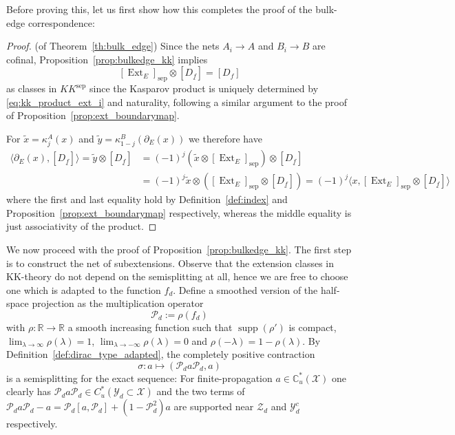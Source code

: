 \documentclass[12pt]{amsart}
\newcommand{\CM}{{\mathbb C}}
\newcommand{\RM}{{\mathbb R}}
\newcommand{\Pp}{{\mathcal P}}
\newcommand{\Xx}{{\mathcal X}}
\newcommand{\Yy}{{\mathcal Y}}
\newcommand{\Zz}{{\mathcal Z}}
\newcommand{\pdv}{\partial}
\DeclareMathOperator*{\Ext}{Ext}
\DeclareMathOperator{\supp}{supp}
\begin{document}
Before proving this, let us first show how this completes the proof of the bulk-edge correspondence:
\begin{proof} (of Theorem~\ref{th:bulk_edge}) 
Since the nets $A_i\to A$ and $B_i\to B$ are cofinal, Proposition~\ref{prop:bulkedge_kk} implies
$$[{\Ext}_E]_{\mathrm{sep}} \otimes [D_{\underline{f}}] = [D_f]$$
as classes in $KK^{\mathrm{sep}}$ since the Kasparov product is uniquely determined by \eqref{eq:kk_product_ext_i} and naturality, following a similar argument to the proof of Proposition~\ref{prop:ext_boundarymap}.

For $\tilde{x}=\kappa_j^A(x)$ and $\tilde{y}=\kappa_{1-j}^B(\pdv_{E}(x))$ we therefore have
\begin{align*}
\langle \pdv_{E}(x), [D_{\underline{f}}]\rangle = \tilde{y} \otimes [D_{\underline{f}}] &= (-1)^{j} (\tilde{x} \otimes [{\Ext}_E]_{\mathrm{sep}}) \otimes [D_{\underline{f}}]\\
&=(-1)^{j}\tilde{x} \otimes ([{\Ext}_E]_{\mathrm{sep}} \otimes [D_{\underline{f}}]) =(-1)^{j}\langle x, [{\Ext}_E]_{\mathrm{sep}}\otimes [D_{\underline{f}}]\rangle
\end{align*}
where the first and last equality hold by Definition~\ref{def:index} and Proposition~\ref{prop:ext_boundarymap} respectively, whereas the middle equality is just associativity of the product.

\end{proof}
We now proceed with the proof of Proposition~\ref{prop:bulkedge_kk}. The first step is to construct the net of subextensions. Observe that the extension classes in KK-theory do not depend on the semisplitting at all, hence we are free to choose one which is adapted to the function $f_d$. Define a smoothed version of the half-space projection as the multiplication operator
$$\Pp_d := \rho(f_d)$$
with $\rho: \RM\to \RM$ a smooth increasing function such that $\supp(\rho')$ is compact, $\lim_{\lambda\to \infty}\rho(\lambda)=1$, $\lim_{\lambda\to -\infty}\rho(\lambda)=0$ and $\rho(-\lambda)=1-\rho(\lambda)$. 
By Definition~\ref{def:dirac_type_adapted}, the completely positive contraction
\[\sigma: a \mapsto (\Pp_d a \Pp_d,a)\]
is a semisplitting for the exact sequence: For finite-propagation $a\in \CM_u^*(\Xx)$ one clearly has $\Pp_d a \Pp_d\in C^*_u(\Yy_d\subset \Xx)$ and the two terms of $\Pp_d a \Pp_d-a= \Pp_d[a,\Pp_d] + (1-\Pp_d^2)a$ are supported near $\Zz_d$ and $\Yy_d^c$ respectively.
\end{document}
